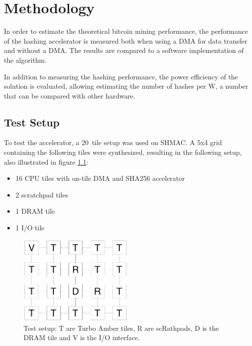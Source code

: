 \chapter{Methodology}
\label{cha:methodology}

In order to estimate the theoretical bitcoin mining performance, the performance
of the hashing accelerator is measured both when using a DMA for data transfer
and without a DMA. The results are compared to a software implementation of the
algorithm.

In addition to measuring the hashing performance, the power efficiency of the
solution is evaluated, allowing estimating the number of hashes per W, a number
that can be compared with other hardware.

\section{Test Setup}
\label{sec:SHMAC_setup}

To test the accelerator, a 20~tile setup was used on SHMAC. A 5x4 grid containing the following
tiles were synthesized, resulting in the following setup, also illustrated in figure \ref{fig:5x4}:

\begin{itemize}
    \item 16 CPU tiles with on-tile DMA and SHA256 accelerator
    \item 2 scratchpad tiles
    \item 1 DRAM tile
    \item 1 I/O tile
\end{itemize}


\begin{figure}[ht]
    \centering
    \includegraphics[width=0.5\textwidth]{Figures/Measurements/5x4}
    \caption{Test setup: T are Turbo Amber tiles, R are scRathpads, D is the DRAM tile and V is the I/O interface.}
    \label{fig:5x4}
\end{figure}

